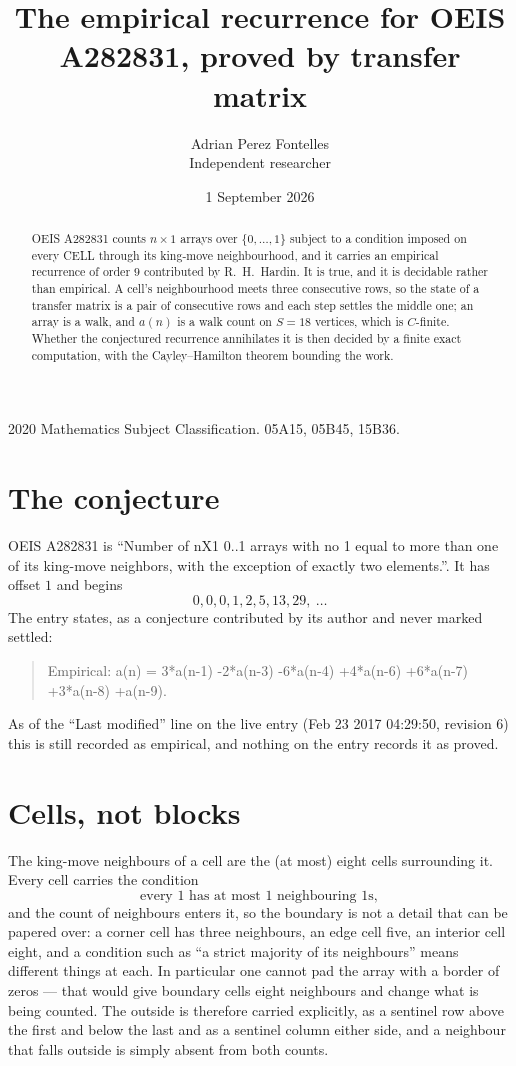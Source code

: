 \documentclass[11pt,a4paper]{article}
\title{The empirical recurrence for OEIS A282831, proved by transfer matrix}
\author{Adrian Perez Fontelles\\ \small Independent researcher}
\date{1 September 2026}
\theoremstyle{plain}
\theoremstyle{definition}
\begin{document}
\maketitle

\begin{abstract}
OEIS A282831 counts $n\times1$ arrays over $\{0,\dots,1\}$ subject to a condition imposed on
every CELL through its king-move neighbourhood, and it carries an empirical recurrence of
order $9$ contributed by R.~H.~Hardin. It is true, and it is decidable rather than
empirical. A cell's neighbourhood meets three consecutive rows, so the state of a transfer
matrix is a pair of consecutive rows and each step settles the middle one; an array is a
walk, and $a(n)$ is a walk count on $S=18$ vertices, which is $C$-finite. Whether the
conjectured recurrence annihilates it is then decided by a finite exact computation, with the
Cayley--Hamilton theorem bounding the work.
\end{abstract}

\noindent\small 2020 Mathematics Subject Classification. 05A15, 05B45, 15B36.\normalsize

\section{The conjecture}

OEIS A282831 is ``Number of nX1 0..1 arrays with no 1 equal to more than one of its king-move neighbors, with the exception of exactly two elements.''. It has offset $1$ and begins
\[
0, 0, 0, 1, 2, 5, 13, 29,\ \dots
\]
The entry states, as a conjecture contributed by its author and never marked settled:
\begin{quote}
Empirical: a(n) = 3*a(n-1) -2*a(n-3) -6*a(n-4) +4*a(n-6) +6*a(n-7) +3*a(n-8) +a(n-9).
\end{quote}
As of the ``Last modified'' line on the live entry (Feb 23 2017 04:29:50, revision 6) this is still
recorded as empirical, and nothing on the entry records it as proved.

\section{Cells, not blocks}

The king-move neighbours of a cell are the (at most) eight cells surrounding it. Every cell
carries the condition
\[
\text{every }1\text{ has at most }1\text{ neighbouring }1\text{s},
\]
and the count of neighbours enters it, so the boundary is not a detail that can be papered
over: a corner cell has three neighbours, an edge cell five, an interior cell eight, and a
condition such as ``a strict majority of its neighbours'' means different things at each. In
particular one cannot pad the array with a border of zeros --- that would give boundary cells
eight neighbours and change what is being counted. The outside is therefore carried
explicitly, as a sentinel row above the first and below the last and as a sentinel column
either side, and a neighbour that falls outside is simply absent from both counts.
\end{document}
